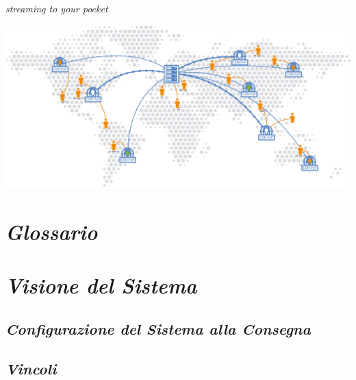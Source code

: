 \documentclass{article}
\author{Agosta, Belli, Emili, Giacchini, Luciani}
\begin{document}
\begin{center}
    \sffamily{\fontsize{50}{48} \selectfont \textcolor{red}{Nexi}\textcolor{green}{Fy}}
\end{center}

\begin{center}
    \itshape{\fontsize{20}{48} \selectfont streaming to your pocket}
\end{center}

\bigskip\bigskip\bigskip

\begin{flushleft}
    \includegraphics[scale=1]{images/worldCDN.png}
\end{flushleft}

\newpage
\printindex

\tableofcontents

\newpage
\section{\itshape{Glossario}}


\newpage
\section{\itshape{Visione del Sistema}}


\subsection{\itshape{Configurazione del Sistema alla Consegna}}


\subsection{\itshape{Vincoli}}

\end{document}
